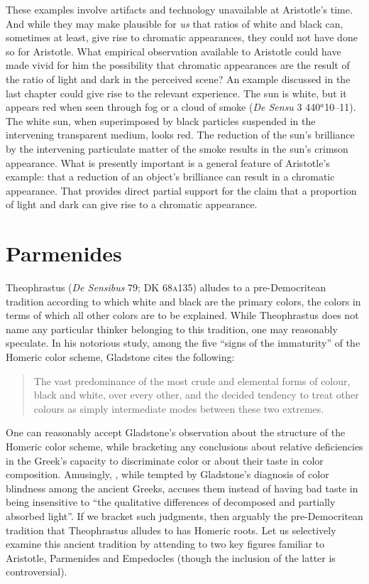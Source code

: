These examples involve artifacts and technology unavailable at Aristotle's time. And while they may make plausible for \emph{us} that ratios of white and black can, sometimes at least, give rise to chromatic appearances, they could not have done so for Aristotle. What empirical observation available to Aristotle could have made vivid for him the possibility that chromatic appearances are the result of the ratio of light and dark in the perceived scene? An example discussed in the last chapter could give rise to the relevant experience. The sun is white, but it appears red when seen through fog or a cloud of smoke (\emph{De Sensu} 3 440\( ^{a} \)10--11).  The white sun, when superimposed by black particles suspended in the intervening transparent medium, looks red. The reduction of the sun's brilliance by the intervening particulate matter of the smoke results in the sun's crimson appearance. What is presently important is a general feature of Aristotle's example: that a reduction of an object's brilliance  can result in a chromatic appearance. That provides direct partial support for the claim that a proportion of light and dark can give rise to a chromatic appearance.


\section{Parmenides} %
\label{sec:parmenides}
Theophrastus (\emph{De Sensibus} 79; DK 68\textsc{a}135) alludes to a pre-Democritean tradition according to which white and black are the primary colors, the colors in terms of which all other colors are to be explained. While Theophrastus does not name any particular thinker belonging to this tradition, one may reasonably speculate. In his notorious study, among the five ``signs of the immaturity'' of the Homeric color scheme, Gladstone cites the following:  
\begin{quote}
    The vast predominance of the most crude and elemental forms of colour, black and white, over every other, and the decided tendency to treat other colours as simply intermediate modes between these two extremes. \citep[458]{Gladstone:1858fk}
\end{quote}
One can reasonably accept Gladstone's observation about the structure of the Ho\-meric color scheme, while bracketing any conclusions about relative deficiencies in the Greek's capacity to discriminate color or about their taste in color composition. Amusingly, \citealt[162]{Platnauer:1921bh}, while tempted by Gladstone's diagnosis of color blindness among the ancient Greeks, accuses them instead of having bad taste in being insensitive to ``the qualitative differences of decomposed and partially absorbed light''. If we bracket such judgments, then arguably the pre-De\-mo\-cri\-tean tradition that Theophrastus alludes to has Homeric roots. Let us selectively examine this ancient tradition by attending to two key figures familiar to Aristotle, Parmenides and Empedocles (though the inclusion of the latter is controversial).

